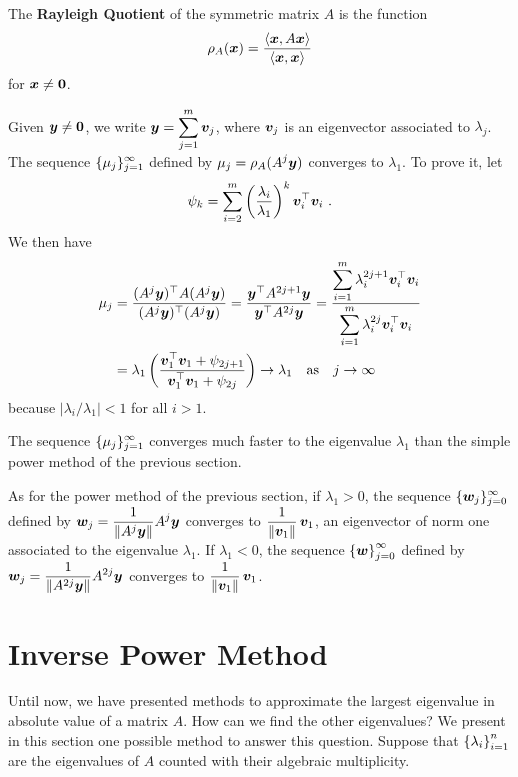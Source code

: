 \begin{defn}
The {\bfseries Rayleigh Quotient} of the
symmetric matrix $A$ is the function
\[
\rho_A(\bm{x}) = \frac{\left\langle{\bm{x}} , {A\bm{x}}\right\rangle}{\left\langle{\bm{x}} , {\bm{x}}\right\rangle}
\]
for $\bm{x} \neq \bm{0}$.
\end{defn}

Given $\bm{y} \neq \bm{0}$, we write
$\displaystyle \bm{y} = \sum_{j=1}^m \bm{v}_j$, where $\bm{v}_j$ is
an eigenvector associated to $\lambda_j$.  The sequence
$\displaystyle \{\mu_j\}_{j=1}^\infty$ defined by
$\displaystyle \mu_j = \rho_A(A^j\bm{y})$
converges to $\lambda_1$.  To prove it, let
\[
\psi_k = \sum_{i=2}^m
\left(\frac{\lambda_i}{\lambda_1}\right)^k \VEC{v}_i^\top \VEC{v}_i \ .
\]
We then have
\begin{align*}
\mu_j &= \frac{(A^j\bm{y})^\top A (A^j \bm{y})}
{(A^j\bm{y})^\top (A^j \bm{y})}
= \frac{\bm{y}^\top A^{2j+1} \bm{y}}
{\bm{y}^\top A^{2j} \bm{y}}
= \frac{\displaystyle \sum_{i=1}^m \lambda_i^{2j+1} \bm{v}_i^\top\bm{v}_i}
{\displaystyle \sum_{i=1}^m \lambda_i^{2j} \bm{v}_i^\top \bm{v}_i} \\
&= \lambda_1 \left(
\frac{\displaystyle \bm{v}_1^\top \bm{v}_1 + \psi_{2j+1}}
{\displaystyle \bm{v}_1^\top \bm{v}_1 + \psi_{2j}} \right)
\rightarrow \lambda_1
\quad \text{as} \quad j\rightarrow \infty
\end{align*}
because $|\lambda_i/\lambda_1|<1$ for all $i>1$.

The sequence $\displaystyle \{ \mu_j \}_{j=1}^\infty$
converges much faster to the eigenvalue $\lambda_1$ than the simple power
method of the previous section.

As for the power method of the previous section, if $\lambda_1 > 0$,
the sequence $\displaystyle \{\bm{w}_j\}_{j=0}^\infty$
defined by $\displaystyle \bm{w}_j = \frac{1}{\|A^j\bm{y}\|}A^j\bm{y}$
converges to $\displaystyle \frac{1}{\|\bm{v}_1\|}\, \bm{v}_1$, an
eigenvector of norm one associated to the eigenvalue $\lambda_1$.
If $\lambda_1 < 0$, the sequence
$\displaystyle \left\{\bm{w}\right\}_{j=0}^\infty$
defined by $\displaystyle \bm{w}_j = \frac{1}{\|A^{2j}\bm{y}\|}A^{2j}\bm{y}$
converges to $\displaystyle \frac{1}{\|\bm{v}_1\|}\, \bm{v}_1$.

\section{Inverse Power Method}

Until now, we have presented methods to approximate the largest
eigenvalue in absolute value of a \nn matrix $A$.  How can we
find the other eigenvalues?  We present in this section one possible
method to answer this question.  Suppose that
$\displaystyle \left\{ \lambda_i \right\}_{i=1}^n$
are the eigenvalues of $A$ counted with their algebraic multiplicity.

